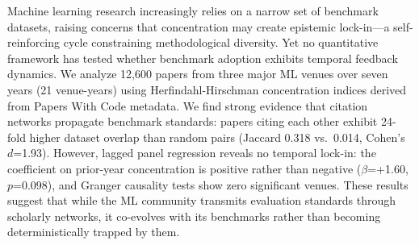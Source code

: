 Machine learning research increasingly relies on a narrow set of benchmark datasets, raising concerns that concentration may create epistemic lock-in---a self-reinforcing cycle constraining methodological diversity. Yet no quantitative framework has tested whether benchmark adoption exhibits temporal feedback dynamics. We analyze 12,600 papers from three major ML venues over seven years (21 venue-years) using Herfindahl-Hirschman concentration indices derived from Papers With Code metadata. We find strong evidence that citation networks propagate benchmark standards: papers citing each other exhibit 24-fold higher dataset overlap than random pairs (Jaccard 0.318 vs.\ 0.014, Cohen's $d$=1.93). However, lagged panel regression reveals no temporal lock-in: the coefficient on prior-year concentration is positive rather than negative ($\beta$=+1.60, $p$=0.098), and Granger causality tests show zero significant venues. These results suggest that while the ML community transmits evaluation standards through scholarly networks, it co-evolves with its benchmarks rather than becoming deterministically trapped by them.
